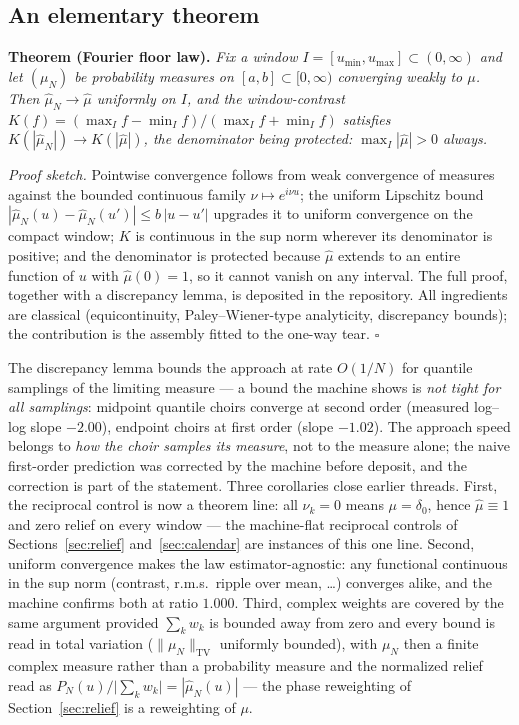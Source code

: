 \documentclass[11pt,a4paper]{article}
\begin{document}
\subsection{An elementary theorem}
\label{sec:theorem}

\medskip\noindent\textbf{Theorem (Fourier floor law).}
\emph{Fix a window $I = [u_{\min}, u_{\max}] \subset (0,\infty)$ and let
$(\mu_N)$ be probability measures on $[a,b] \subset [0,\infty)$
converging weakly to $\mu$. Then $\hat{\mu}_N \to \hat{\mu}$ uniformly on
$I$, and the window-contrast
$K(f) = (\max_I f - \min_I f)/(\max_I f + \min_I f)$ satisfies
$K(|\hat{\mu}_N|) \to K(|\hat{\mu}|)$, the denominator being protected:
$\max_I |\hat{\mu}| > 0$ always.}

\medskip\noindent
\emph{Proof sketch.} Pointwise convergence follows from weak convergence
of measures against the bounded continuous family
$\nu \mapsto e^{i\nu u}$; the uniform Lipschitz bound
$|\hat{\mu}_N(u) - \hat{\mu}_N(u')| \le b\,|u - u'|$ upgrades it to
uniform convergence on the compact window; $K$ is continuous in the sup
norm wherever its denominator is positive; and the denominator is
protected because $\hat{\mu}$ extends to an entire function of $u$ with
$\hat{\mu}(0) = 1$, so it cannot vanish on any interval. The full proof,
together with a discrepancy lemma, is deposited in the repository. All
ingredients are classical (equicontinuity, Paley--Wiener-type
analyticity, discrepancy bounds); the contribution is the assembly
fitted to the one-way tear. \hfill$\square$

\medskip
The discrepancy lemma bounds the approach at rate $O(1/N)$ for quantile
samplings of the limiting measure --- a bound the machine shows is
\emph{not tight for all samplings}: midpoint quantile choirs converge at
second order (measured log--log slope $-2.00$), endpoint choirs at first
order (slope $-1.02$). The approach speed belongs to \emph{how the choir
samples its measure}, not to the measure alone; the naive first-order
prediction was corrected by the machine before deposit, and the
correction is part of the statement. Three corollaries close earlier
threads. First, the reciprocal control is now a theorem line: all
$\nu_k = 0$ means $\mu = \delta_0$, hence $\hat{\mu} \equiv 1$ and zero
relief on every window --- the machine-flat reciprocal controls of
Sections~\ref{sec:relief} and~\ref{sec:calendar} are instances of this
one line. Second, uniform convergence makes the law
estimator-agnostic: any functional continuous in the sup norm (contrast,
r.m.s.\ ripple over mean, \dots) converges alike, and the machine
confirms both at ratio $1.000$. Third, complex weights are covered
by the same argument provided $\sum_k w_k$ is bounded away from zero and
every bound is read in total variation ($\|\mu_N\|_{\mathrm{TV}}$ uniformly
bounded), with $\mu_N$ then a finite complex measure rather than a
probability measure and the normalized relief read as
$P_N(u)/\bigl|\sum_k w_k\bigr| = |\hat{\mu}_N(u)|$ --- the phase reweighting
of Section~\ref{sec:relief} is a reweighting of $\mu$.
\end{document}
